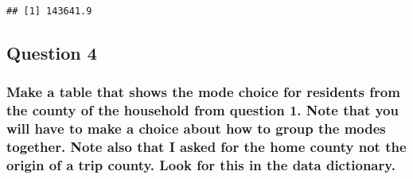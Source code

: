 \documentclass[
]{article}
\newenvironment{Shaded}{\begin{snugshade}}{\end{snugshade}}
\newcommand{\AttributeTok}[1]{\textcolor[rgb]{0.77,0.63,0.00}{#1}}
\newcommand{\DecValTok}[1]{\textcolor[rgb]{0.00,0.00,0.81}{#1}}
\newcommand{\FunctionTok}[1]{\textcolor[rgb]{0.00,0.00,0.00}{#1}}
\newcommand{\NormalTok}[1]{#1}
\newcommand{\OtherTok}[1]{\textcolor[rgb]{0.56,0.35,0.01}{#1}}
\newcommand{\SpecialCharTok}[1]{\textcolor[rgb]{0.00,0.00,0.00}{#1}}
\newcommand{\StringTok}[1]{\textcolor[rgb]{0.31,0.60,0.02}{#1}}
\begin{document}
\begin{Shaded}
\end{Shaded}

\begin{verbatim}
## [1] 143641.9
\end{verbatim}

\hypertarget{question-4}{%
\subsection{Question 4}\label{question-4}}

\hypertarget{make-a-table-that-shows-the-mode-choice-for-residents-from-the-county-of-the-household-from-question-1.-note-that-you-will-have-to-make-a-choice-about-how-to-group-the-modes-together.-note-also-that-i-asked-for-the-home-county-not-the-origin-of-a-trip-county.-look-for-this-in-the-data-dictionary.}{%
\subsubsection{Make a table that shows the mode choice for residents
from the county of the household from question 1. Note that you will
have to make a choice about how to group the modes together. Note also
that I asked for the home county not the origin of a trip county. Look
for this in the data
dictionary.}\label{make-a-table-that-shows-the-mode-choice-for-residents-from-the-county-of-the-household-from-question-1.-note-that-you-will-have-to-make-a-choice-about-how-to-group-the-modes-together.-note-also-that-i-asked-for-the-home-county-not-the-origin-of-a-trip-county.-look-for-this-in-the-data-dictionary.}}

\begin{Shaded}
\end{Shaded}
\end{document}
